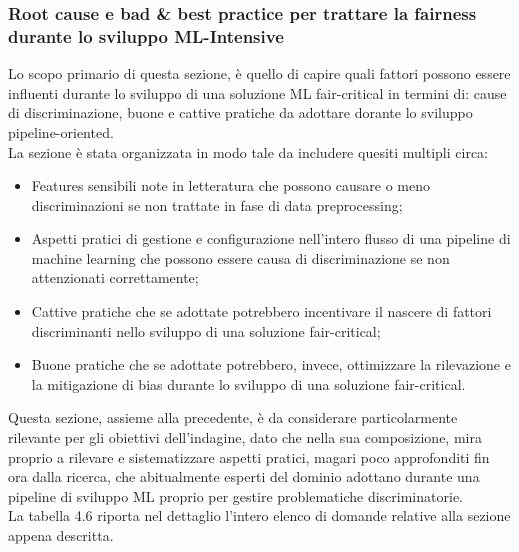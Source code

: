     
    
   \subsubsection{Root cause e bad \& best practice per trattare la fairness durante lo sviluppo ML-Intensive}
   
   Lo scopo primario di questa sezione, è quello di capire quali fattori possono essere influenti durante lo sviluppo di una soluzione ML fair-critical in termini di: cause di discriminazione, buone e cattive pratiche da adottare dorante lo sviluppo pipeline-oriented.\\
   La sezione è stata organizzata in modo tale da includere quesiti multipli circa:
   
   \begin{itemize}
       \item Features sensibili note in letteratura che possono causare o meno discriminazioni se non trattate in fase di data preprocessing;
       \item Aspetti pratici di gestione e configurazione nell'intero flusso di una pipeline di machine learning che possono essere causa di discriminazione se non attenzionati correttamente;
       \item Cattive pratiche che se adottate potrebbero incentivare il nascere di fattori discriminanti nello sviluppo di una soluzione fair-critical;
       \item Buone pratiche che se adottate potrebbero, invece, ottimizzare la rilevazione e la mitigazione di bias durante lo sviluppo di una soluzione fair-critical.
   \end{itemize}
   
  Questa sezione, assieme alla precedente, è da considerare particolarmente rilevante per gli obiettivi dell'indagine, dato che nella sua composizione, mira proprio a rilevare e sistematizzare aspetti pratici, magari poco approfonditi fin ora dalla ricerca, che abitualmente esperti del dominio adottano durante una pipeline di sviluppo ML proprio per gestire problematiche discriminatorie.\\
  
  La tabella 4.6 riporta nel dettaglio l'intero elenco di domande relative alla sezione appena descritta.
   
